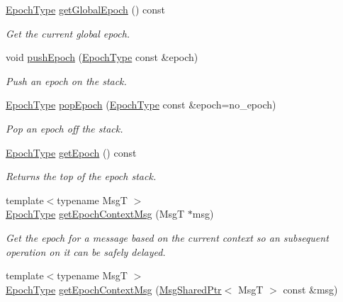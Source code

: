 \begin{DoxyCompactItemize}
\hyperlink{namespacevt_a985a5adf291c34a3ca263b3378388236}{Epoch\+Type} \hyperlink{structvt_1_1messaging_1_1_active_messenger_abb892a84a906954d8769794ccfb0c638}{get\+Global\+Epoch} () const
\begin{DoxyCompactList}\small\item\em Get the current global epoch. \end{DoxyCompactList}\item 
void \hyperlink{structvt_1_1messaging_1_1_active_messenger_ac60a61b85392a5c40d2334919981963a}{push\+Epoch} (\hyperlink{namespacevt_a985a5adf291c34a3ca263b3378388236}{Epoch\+Type} const \&epoch)
\begin{DoxyCompactList}\small\item\em Push an epoch on the stack. \end{DoxyCompactList}\item 
\hyperlink{namespacevt_a985a5adf291c34a3ca263b3378388236}{Epoch\+Type} \hyperlink{structvt_1_1messaging_1_1_active_messenger_a0ff3c2d9bf6ccd66002679b93821229c}{pop\+Epoch} (\hyperlink{namespacevt_a985a5adf291c34a3ca263b3378388236}{Epoch\+Type} const \&epoch=no\+\_\+epoch)
\begin{DoxyCompactList}\small\item\em Pop an epoch off the stack. \end{DoxyCompactList}\item 
\hyperlink{namespacevt_a985a5adf291c34a3ca263b3378388236}{Epoch\+Type} \hyperlink{structvt_1_1messaging_1_1_active_messenger_a627a8b2918ad283edf386038cf5693ca}{get\+Epoch} () const
\begin{DoxyCompactList}\small\item\em Returns the top of the epoch stack. \end{DoxyCompactList}\item 
{\footnotesize template$<$typename MsgT $>$ }\\\hyperlink{namespacevt_a985a5adf291c34a3ca263b3378388236}{Epoch\+Type} \hyperlink{structvt_1_1messaging_1_1_active_messenger_aa60710a2d4a1ac7fe60113fd8cbb9809}{get\+Epoch\+Context\+Msg} (MsgT $\ast$msg)
\begin{DoxyCompactList}\small\item\em Get the epoch for a message based on the current context so an subsequent operation on it can be safely delayed. \end{DoxyCompactList}\item 
{\footnotesize template$<$typename MsgT $>$ }\\\hyperlink{namespacevt_a985a5adf291c34a3ca263b3378388236}{Epoch\+Type} \hyperlink{structvt_1_1messaging_1_1_active_messenger_a66c64223357aa92f45a4a4042bd63a5f}{get\+Epoch\+Context\+Msg} (\hyperlink{structvt_1_1messaging_1_1_msg_shared_ptr}{Msg\+Shared\+Ptr}$<$ MsgT $>$ const \&msg)

\end{DoxyCompactItemize}
